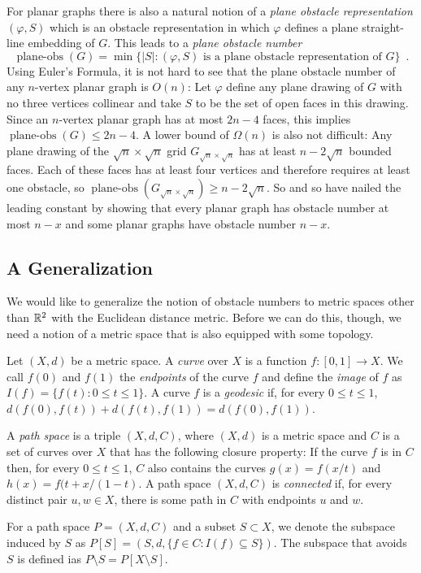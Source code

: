 \documentclass{patmorin}
\DeclareMathOperator{\planeobs}{plane-obs}
\begin{document}
For planar graphs there is also a natural notion of a \emph{plane obstacle
representation} $(\varphi, S)$ which is an obstacle representation
in which $\varphi$ defines a plane straight-line embedding of $G$.
This leads to a \emph{plane obstacle number}
\[
    \planeobs(G) = \min\{|S| :\text{$(\varphi, S)$ is a plane obstacle representation of $G$}\} \enspace .
\]
Using Euler's Formula, it is not hard to see that the plane obstacle
number of any $n$-vertex planar graph is $O(n)$: Let $\varphi$ define
any plane drawing of $G$ with no three vertices collinear and take $S$
to be the set of open faces in this drawing.  Since an $n$-vertex planar
graph has at most $2n-4$ faces, this implies $\planeobs(G)\le 2n-4$.
A lower bound of $\Omega(n)$ is also not difficult:  Any plane drawing
of the $\sqrt{n}\times\sqrt{n}$ grid $G_{\sqrt{n}\times\sqrt{n}}$
has at least $n-2\sqrt{n}$ bounded faces. Each of these faces has
at least four vertices and therefore requires at least one obstacle,
so $\planeobs(G_{\sqrt{n}\times\sqrt{n}})\ge n-2\sqrt{n}$.  So and so
\cite{X} have nailed the leading constant by showing that every planar
graph has obstacle number at most $n-x$ and some planar graphs have
obstacle number $n-x$.

\subsection{A Generalization}

We would like to generalize the notion of obstacle numbers to metric
spaces other than $\mathbb{R}^2$ with the Euclidean distance metric.  Before we
can do this, though, we need a notion of a metric space that is also
equipped with some topology.

Let $(X,d)$ be a metric space.  A \emph{curve} over $X$ is a function
$f:[0,1]\to X$.  We call $f(0)$ and $f(1)$ the \emph{endpoints} of the
curve $f$ and define the \emph{image} of $f$ as $I(f)=\{f(t):0\le t\le
1\}$.  A curve $f$ is a \emph{geodesic} if, for every $0\le t\le 1$,
$d(f(0),f(t)) + d(f(t),f(1)) = d(f(0),f(1))$.

A \emph{path space} is a triple $(X,d,C)$, where $(X,d)$ is a metric
space and $C$ is a set of curves over $X$ that has the following closure
property:  If the curve $f$ is in $C$ then, for every $0\le t\le 1$,
$C$ also contains the curves $g(x)=f(x/t)$ and $h(x)=f(t+x/(1-t)$.
A path space $(X,d,C)$ is \emph{connected} if, for every distinct pair
$u,w\in X$, there is some path in $C$ with endpoints $u$ and $w$.

For a path space $P=(X,d,C)$ and a subset $S\subset X$, we denote the
subspace induced by $S$ as $P[S]=(S,d,\{f\in C:I(f)\subseteq S\})$.  The
subspace that avoids $S$ is defined ias $P\setminus S = P[X\setminus S]$.
\end{document}
